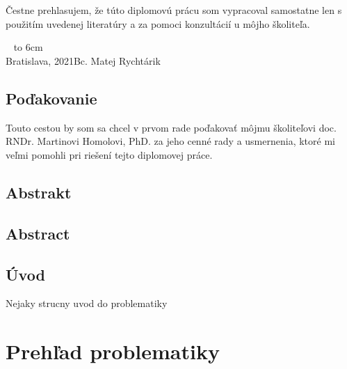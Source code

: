 \documentclass[12pt, a4paper, oneside]{book}
\newcommand\mfauthor{Bc. Matej Rychtárik}
\newcommand\mfplacedate{Bratislava, 2021}
\begin{document}
\thispagestyle{empty}

%

{~}\vspace{12cm}

\noindent
\begin{minipage}{0.25\textwidth}~\end{minipage}
\begin{minipage}{0.75\textwidth}
Čestne prehlasujem, že túto diplomovú prácu som vypracoval samostatne len s použitím uvedenej literatúry a za pomoci konzultácií u môjho školiteľa.
\newline \newline
\end{minipage}
\vfill
~ \hfill {\hbox to 6cm{\dotfill}} \\
\mfplacedate \hfill \mfauthor
\vfill\eject 

\chapter*{Poďakovanie}\label{chap:thank_you}
Touto cestou by som sa chcel v prvom rade poďakovať môjmu školiteľovi doc. RNDr. Martinovi Homolovi, PhD. za jeho cenné rady a usmernenia, ktoré mi veľmi pomohli pri riešení tejto diplomovej práce. 
\vfill\eject 

\chapter*{Abstrakt}\label{chap:abstract_sk}


\chapter*{Abstract}\label{chap:abstract_en}


\tableofcontents

\mainmatter

\chapter{Úvod}\label{chap:intro}
Nejaky strucny uvod do problematiky

\part{Prehľad problematiky}
\end{document}
